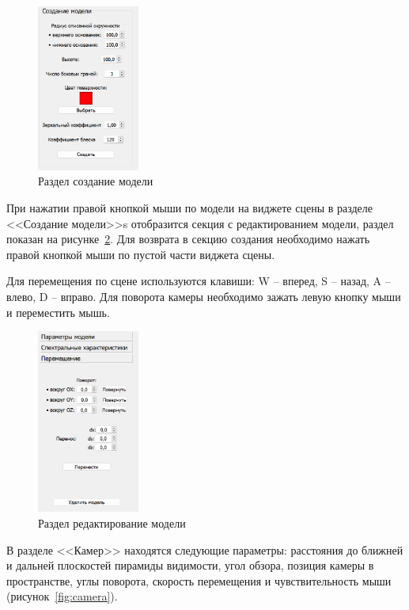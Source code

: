 \clearpage

\begin{figure}[h]
	\centering
	\includegraphics[width=0.3\textwidth]{img/examples/create.png}
	\caption{Раздел создание модели}
	\label{fig:create}
\end{figure}

При нажатии правой кнопкой мыши по модели на виджете сцены в разделе <<Создание модели>>s отобразится секция с редактированием модели, раздел показан на рисунке~\ref{fig:change-model}. 
Для возврата в секцию создания необходимо нажать правой кнопкой мыши по пустой части виджета сцены.

Для перемещения по сцене используются клавиши: W – вперед, S – назад, A – влево, D – вправо. Для поворота камеры необходимо зажать левую кнопку мыши и переместить мышь.

\clearpage
\begin{figure}[h]
	\centering
	\includegraphics[width=0.3\textwidth]{img/examples/change-model.png}
	\caption{Раздел редактирование модели}
	\label{fig:change-model}
\end{figure}

В разделе <<Камер>> находятся следующие параметры: расстояния до ближней и дальней плоскостей пирамиды видимости, угол обзора, позиция камеры в пространстве, углы поворота, скорость перемещения и чувствительность мыши (рисунок~\ref{fig:camera}).

